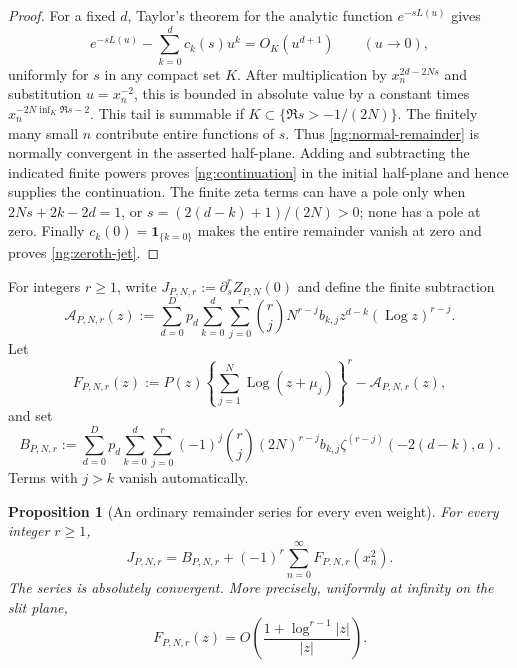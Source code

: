 \documentclass[11pt,letterpaper]{article}
\numberwithin{equation}{section}
\newtheorem{proposition}[theorem]{Proposition}
\theoremstyle{definition}
\theoremstyle{remark}
\DeclareMathOperator{\Log}{Log}
\begin{document}
\begin{proof}
For a fixed $d$, Taylor's theorem for the analytic function
$e^{-sL(u)}$ gives
\[
 e^{-sL(u)}-\sum_{k=0}^{d}c_k(s)u^k=O_K(u^{d+1})
 \qquad(u\to0),
\]
uniformly for $s$ in any compact set $K$.
After multiplication by $x_n^{2d-2Ns}$ and substitution
$u=x_n^{-2}$, this is bounded in absolute value by a constant
times $x_n^{-2N\inf_K\Re s-2}$.
This tail is summable if $K\subset\{\Re s>-1/(2N)\}$.
The finitely many small $n$ contribute entire functions of $s$.
Thus \eqref{ng:normal-remainder} is normally convergent in the
asserted half-plane.  Adding and subtracting the indicated
finite powers proves \eqref{ng:continuation} in the initial
half-plane and hence supplies the continuation.
The finite zeta terms can have a pole only when
$2Ns+2k-2d=1$, or
$s=(2(d-k)+1)/(2N)>0$; none has a pole at zero.
Finally $c_k(0)=\boldsymbol1_{\{k=0\}}$ makes the entire
remainder vanish at zero and proves \eqref{ng:zeroth-jet}.
\end{proof}

For integers $r\geq1$, write
$J_{P,N,r}:=\partial_s^rZ_{P,N}(0)$ and define the finite
subtraction
\begin{equation}
 \mathcal A_{P,N,r}(z)
 :=\sum_{d=0}^{D}p_d\sum_{k=0}^{d}\sum_{j=0}^{r}
       \binom{r}{j}N^{r-j}b_{k,j}
                     z^{d-k}(\Log z)^{r-j}.
 \label{ng:asymptotic-subtraction}
\end{equation}
Let
\begin{equation}
 F_{P,N,r}(z)
 :=P(z)\left\{\sum_{j=1}^{N}\Log(z+\mu_j)\right\}^{r}
                  -\mathcal A_{P,N,r}(z),
 \label{ng:subtracted-function}
\end{equation}
and set
\begin{equation}
 B_{P,N,r}
 :=\sum_{d=0}^{D}p_d\sum_{k=0}^{d}\sum_{j=0}^{r}
       (-1)^j\binom{r}{j}(2N)^{r-j}b_{k,j}
                    \zeta^{(r-j)}(-2(d-k),a).
 \label{ng:finite-baseline}
\end{equation}
Terms with $j>k$ vanish automatically.

\begin{proposition}[An ordinary remainder series for every even weight]
\label{ng:ordinary-series}
For every integer $r\geq1$,
\begin{equation}
 J_{P,N,r}
 =B_{P,N,r}+(-1)^r\sum_{n=0}^{\infty}F_{P,N,r}(x_n^2).
 \label{ng:jet-series}
\end{equation}
The series is absolutely convergent.  More precisely, uniformly
at infinity on the slit plane,
\begin{equation}
 F_{P,N,r}(z)
 =O\left(\frac{1+\log^{r-1}|z|}{|z|}\right).
 \label{ng:large-z-bound}
\end{equation}
\end{proposition}
\end{document}
